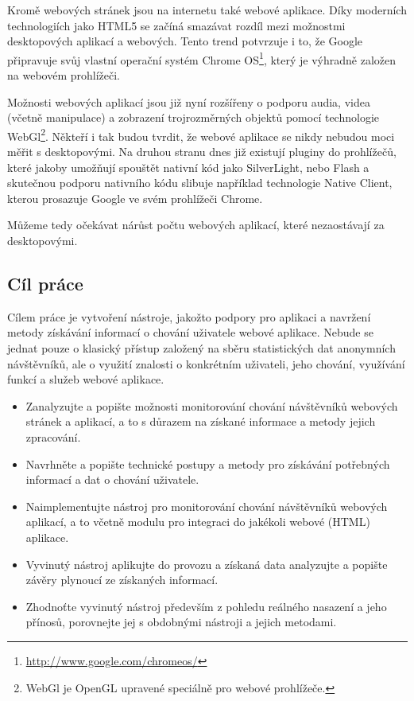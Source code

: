 \documentclass[bc,male,java,dept456]{diploma}						%
\begin{document}
Kromě webových stránek jsou na internetu také webové aplikace. Díky moderních technologiích jako HTML5 se začíná smazávat rozdíl mezi možnostmi desktopových aplikací a webových. Tento trend potvrzuje i to, že Google připravuje svůj vlastní operační systém Chrome OS\footnote{\url{http://www.google.com/chromeos/}}, který je výhradně založen na webovém prohlížeči.

Možnosti webových aplikací jsou již nyní rozšířeny o podporu audia, videa (včetně manipulace) a zobrazení trojrozměrných objektů pomocí technologie WebGl\footnote{WebGl je OpenGL upravené speciálně pro webové prohlížeče.}. Někteří i tak budou tvrdit, že webové aplikace se nikdy nebudou moci měřit s desktopovými. Na druhou stranu dnes již existují pluginy do prohlížečů, které jakoby umožňují spouštět nativní kód jako SilverLight, nebo Flash a skutečnou podporu nativního kódu slibuje například technologie Native Client, kterou prosazuje Google ve svém prohlížeči Chrome.

Můžeme tedy očekávat nárůst počtu webových aplikací, které nezaostávají za desktopovými. 

\subsection{Cíl práce}

Cílem práce je vytvoření nástroje, jakožto podpory pro aplikaci a navržení metody zí\-ská\-vá\-ní informací o chování uživatele webové aplikace. Nebude se jednat pouze o klasický přístup založený na sběru statistických dat anonymních návštěvníků, ale o využití znalosti o konkrétním uživateli, jeho chování, využívání funkcí a služeb webové aplikace.

\begin{itemize}
	\item Zanalyzujte a popište možnosti monitorování chování návštěvníků webových strá\-nek a aplikací, a to s důrazem na získané informace a metody jejich zpracování.
	\item Navrhněte a popište technické postupy a metody pro získávání potřebných informací a dat o chování uživatele.
	\item Naimplementujte nástroj pro monitorování chování návštěvníků webových aplikací, a to včetně modulu pro integraci do jakékoli webové (HTML) aplikace.
	\item Vyvinutý nástroj aplikujte do provozu a získaná data analyzujte a popište závěry plynoucí ze získaných informací.
	\item Zhodnoťte vyvinutý nástroj především z pohledu reálného nasazení a jeho přínosů, porovnejte jej s obdobnými nástroji a jejich metodami.
\end{itemize}
\end{document}
